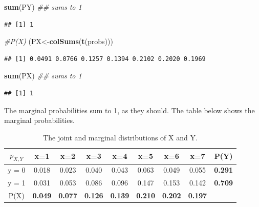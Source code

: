 \documentclass[12pt,]{krantz}
\newenvironment{Shaded}{\begin{snugshade}}{\end{snugshade}}
\newcommand{\CommentTok}[1]{\textcolor[rgb]{0.56,0.35,0.01}{\textit{#1}}}
\newcommand{\KeywordTok}[1]{\textcolor[rgb]{0.13,0.29,0.53}{\textbf{#1}}}
\newcommand{\NormalTok}[1]{#1}
\theoremstyle{definition}
\theoremstyle{definition}
\theoremstyle{definition}
\theoremstyle{remark}
\begin{document}
\begin{Shaded}
\begin{Highlighting}[]
\KeywordTok{sum}\NormalTok{(PY) }\CommentTok{## sums to 1}
\end{Highlighting}
\end{Shaded}

\begin{verbatim}
## [1] 1
\end{verbatim}

\begin{Shaded}
\begin{Highlighting}[]
\CommentTok{#P(X)}
\NormalTok{(PX<-}\KeywordTok{colSums}\NormalTok{(}\KeywordTok{t}\NormalTok{(probs)))}
\end{Highlighting}
\end{Shaded}

\begin{verbatim}
## [1] 0.0491 0.0766 0.1257 0.1394 0.2102 0.2020 0.1969
\end{verbatim}

\begin{Shaded}
\begin{Highlighting}[]
\KeywordTok{sum}\NormalTok{(PX) }\CommentTok{## sums to 1}
\end{Highlighting}
\end{Shaded}

\begin{verbatim}
## [1] 1
\end{verbatim}

The marginal probabilities sum to 1, as they should. The table below shows the marginal probabilities.

\small
\begin{table}[!htbp]
\begin{center}
\begin{tabular}{c|ccccccc|c}
$p_{X,Y}$ & x=1 & x=2 & x=3 & x=4 & x=5 & x=6 & x=7 & P(Y)\\
\hline
y = 0 & 0.018 & 0.023 & 0.040 & 0.043 & 0.063 & 0.049 & 0.055 &  \textbf{0.291}\\
y = 1 & 0.031 & 0.053 & 0.086 & 0.096 &  0.147 & 0.153 &  0.142 &  \textbf{0.709}\\
\hline
P(X) & \textbf{0.049} & \textbf{0.077} & \textbf{0.126} & \textbf{0.139} & \textbf{0.210} & \textbf{0.202} & \textbf{0.197}\\
\end{tabular}
\end{center}
\caption{The joint and marginal distributions of X and Y.}\label{discretebivartable2}
\end{table}
\normalsize
\end{document}
